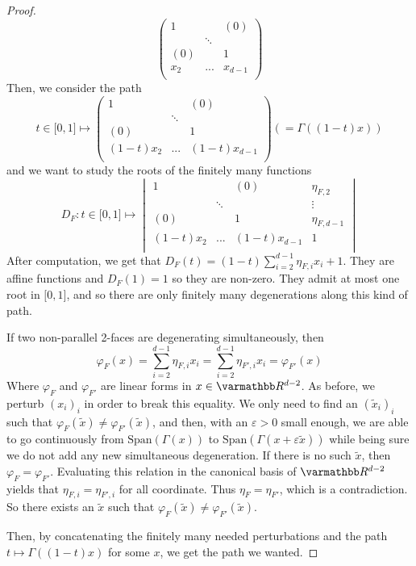 \documentclass[12pt, notitlepage]{article}
\renewcommand{\mathbb}{\varmathbb}
\theoremstyle{plain}
\theoremstyle{definition}
\theoremstyle{plain}
\theoremstyle{remark}
\theoremstyle{plain}
\theoremstyle{plain}
\newcommand{\R}{\mathbb R}
\newcommand{\vect}{\text{Span}}
\begin{document}
\begin{proof}
\[\begin{pmatrix}
        1& &(0) \\
         &\ddots& \\
        (0)& &1\\
        x_2&...&x_{d-1}\\
    \end{pmatrix} \]
    Then, we consider the path \[ t \in \mathopen [0,1  \mathclose] \mapsto \begin{pmatrix}
        1& &(0) \\
         &\ddots& \\
        (0)& &1\\
        (1-t)x_2&...&(1-t)x_{d-1}\\
    \end{pmatrix} \left(= \Gamma((1-t)x)\right) \] and we want to study the roots of the finitely many functions \[ D_F : t \in \mathopen [0,1  \mathclose] \mapsto \begin{vmatrix}
        1& &(0) &\eta_{F,2} \\
         &\ddots& & \vdots \\
        (0)& &1 & \eta_{F,d-1} \\
        (1-t)x_2&...&(1-t)x_{d-1} &1\\
    \end{vmatrix} \] After computation, we get that $\displaystyle D_F(t) = (1-t)\sum_{i=2}^{d-1}\eta_{F,i}x_i +1 $. They are affine functions and $D_F(1) = 1$ so they are non-zero. They admit at most one root in $\mathopen [0,1  \mathclose]$, and so there are only finitely many degenerations along this kind of path.
    
    If two non-parallel 2-faces are degenerating simultaneously, then \[ \varphi_F(x) = \sum_{i=2}^{d-1}\eta_{F,i}x_i = \sum_{i=2}^{d-1}\eta_{F',i}x_i = \varphi_{F'}(x) \] Where $\varphi_F$ and $\varphi_{F'}$ are linear forms in $x\in \R^{d-2}$. As before, we perturb $(x_i)_i$ in order to break this equality. We only need to find an $(\tilde x_i)_i$ such that $\varphi_F(\tilde x) \neq \varphi_{F'} (\tilde x)$, and then, with an $\varepsilon>0$ small enough, we are able to go continuously from $\vect(\Gamma(x))$ to $\vect(\Gamma(x+\varepsilon \tilde x))$ while being sure we do not add any new simultaneous degeneration. If there is no such $\tilde x$, then $\varphi_F = \varphi_{F'}$. Evaluating this relation in the canonical basis of $\R^{d-2}$ yields that $\eta_{F,i} = \eta_{F',i}$ for all coordinate. Thus $\eta_F = \eta_{F'}$, which is a contradiction. So there exists an $\tilde x$ such that $\varphi_F(\tilde x) \neq \varphi_{F'} (\tilde x)$.
    
    Then, by concatenating the finitely many needed perturbations and the path $t\mapsto \Gamma((1-t)x)$ for some $x$, we get the path we wanted.
\end{proof}
\end{document}
